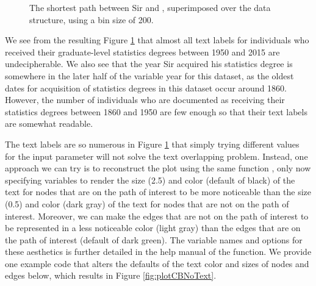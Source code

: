 \documentclass[article,shortnames]{jss}
\begin{document}
\begin{figure}[H]
    \centering
    \caption{The shortest path between Sir  and , superimposed over the data structure, using a bin size of 200.}
    \label{fig:plotCBText}
\end{figure}

We see from the resulting Figure \ref{fig:plotCBText} that almost all text labels for individuals who received their graduate-level statistics degrees between 1950 and 2015 are undecipherable. We also see that the year Sir  acquired his statistics degree is somewhere in the later half of the variable year for this dataset, as the oldest dates for acquisition of statistics degrees in this dataset occur around 1860. However, the number of individuals who are documented as receiving their statistics degrees between 1860 and 1950 are few enough so that their text labels are somewhat readable.

The text labels are so numerous in Figure \ref{fig:plotCBText} that simply trying different values for the input parameter  will not solve the text overlapping problem. Instead, one approach we can try is to reconstruct the plot using the same  function , only now specifying variables to render the size (2.5) and color (default of black) of the text for nodes that are on the path of interest to be more noticeable than the size (0.5) and color (dark gray) of the text for nodes that are not on the path of interest. Moreover, we can make the edges that are not on the path of interest to be represented in a less noticeable color (light gray) than the edges that are on the path of interest (default of dark green). The variable names and options for these aesthetics is further detailed in the help manual of the function. We provide one example code that alters the defaults of the text color and sizes of nodes and edges below, which results in Figure \ref{fig:plotCBNoText}.
\end{document}
